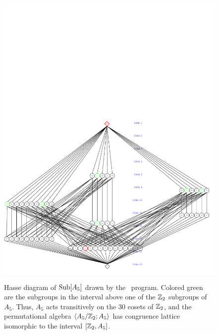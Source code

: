 \begin{figure}[h!]
\begin{center}
\vspace{-5cm}
\includegraphics[height=15cm]{A5UpperN5.pdf}%
\caption{Hasse diagram of $\operatorname{Sub}[A_5]$ drawn by the \xgap\ program. Colored green are the
subgroups in the interval above one of the $\mathbb{Z}_2$ subgroups of $A_5$.  Thus,
$A_5$ acts transitively on the 30 cosets of $\mathbb{Z}_2$, and the
permutational algebra $\langle A_5/\mathbb{Z}_2; A_5\rangle$ has congruence lattice isomorphic to 
the interval $[\mathbb{Z}_2, A_5]$.}
\label{fig:A5new}
\end{center}
\end{figure}

